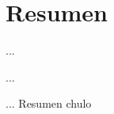 %
%
%
%
%

\chapter{Resumen}

\begin{FraseCelebre}
\begin{Frase}
...
\end{Frase}
\begin{Fuente}
...
\end{Fuente}
\end{FraseCelebre}

... Resumen chulo

\endinput
